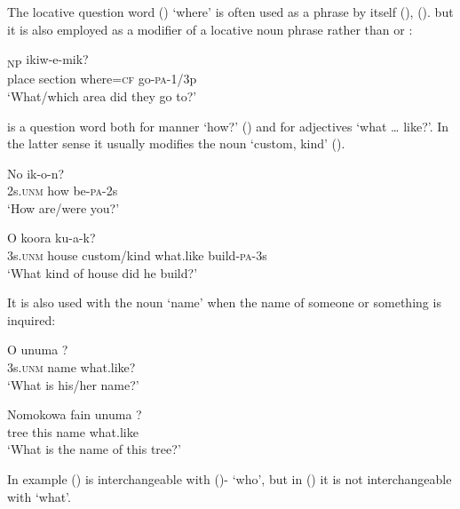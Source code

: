 The locative question word () `where' is often used as a phrase by itself (), (). but it is also employed as a modifier of a locative noun phrase rather than  or : 

\ea%
\label{ex:x1853}
\gll [Epa ara \textstyleEmphasizedVernacularWords{kaan=eke}]\textsubscript{NP} ikiw-e-mik? \\
place section where=\textsc{cf} go-\textsc{pa}-1/3p\\
\glt`What/which area did they go to?'
\z

 is a question word both for manner `how?' () and for adjectives `what {\dots} like?'. In the latter sense it usually modifies the noun  `custom, kind' ().

\ea%
\label{ex:x527}
\gll No  ik-o-n? \\
2s.\textsc{unm} how be-\textsc{pa}-2s\\
\glt`How are/were you?'
\z

\ea%
\label{ex:x528}
\gll O koora   ku-a-k? \\
3s.\textsc{unm} house custom/kind what.like build-\textsc{pa}-3s\\
\glt`What kind of house did he build?'
\z

It is also used with the noun  `name' when the name of someone or something is inquired:

\ea%
\label{ex:x650}
\gll O unuma ? \\
3s.\textsc{unm} name what.like?\\
\glt`What is his/her name?'
\z

\ea%
\label{ex:x651}
\gll Nomokowa fain unuma ? \\
tree this name what.like\\
\glt`What is the name of this tree?'
\z

In example ()  is interchangeable with ()- `who', but in () it is not interchangeable with  `what'.

